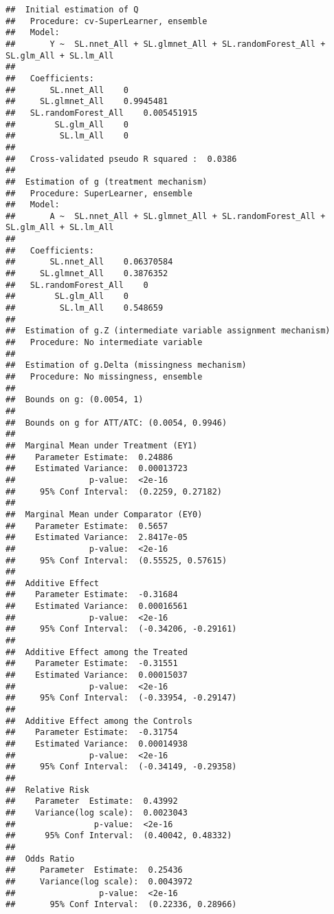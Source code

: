 \documentclass[
]{article}
\newenvironment{Shaded}{\begin{snugshade}}{\end{snugshade}}
\newcommand{\NormalTok}[1]{#1}
\newcommand{\SpecialCharTok}[1]{\textcolor[rgb]{0.81,0.36,0.00}{\textbf{#1}}}
\begin{document}
\begin{verbatim}
##  Initial estimation of Q
##   Procedure: cv-SuperLearner, ensemble
##   Model:
##       Y ~  SL.nnet_All + SL.glmnet_All + SL.randomForest_All + SL.glm_All + SL.lm_All
## 
##   Coefficients: 
##       SL.nnet_All    0 
##     SL.glmnet_All    0.9945481 
##   SL.randomForest_All    0.005451915 
##        SL.glm_All    0 
##         SL.lm_All    0 
## 
##   Cross-validated pseudo R squared :  0.0386 
## 
##  Estimation of g (treatment mechanism)
##   Procedure: SuperLearner, ensemble
##   Model:
##       A ~  SL.nnet_All + SL.glmnet_All + SL.randomForest_All + SL.glm_All + SL.lm_All 
## 
##   Coefficients: 
##       SL.nnet_All    0.06370584 
##     SL.glmnet_All    0.3876352 
##   SL.randomForest_All    0 
##        SL.glm_All    0 
##         SL.lm_All    0.548659 
## 
##  Estimation of g.Z (intermediate variable assignment mechanism)
##   Procedure: No intermediate variable 
## 
##  Estimation of g.Delta (missingness mechanism)
##   Procedure: No missingness, ensemble
## 
##  Bounds on g: (0.0054, 1) 
## 
##  Bounds on g for ATT/ATC: (0.0054, 0.9946) 
## 
##  Marginal Mean under Treatment (EY1)
##    Parameter Estimate:  0.24886
##    Estimated Variance:  0.00013723
##               p-value:  <2e-16
##     95% Conf Interval:  (0.2259, 0.27182)
## 
##  Marginal Mean under Comparator (EY0)
##    Parameter Estimate:  0.5657
##    Estimated Variance:  2.8417e-05
##               p-value:  <2e-16
##     95% Conf Interval:  (0.55525, 0.57615)
## 
##  Additive Effect
##    Parameter Estimate:  -0.31684
##    Estimated Variance:  0.00016561
##               p-value:  <2e-16
##     95% Conf Interval:  (-0.34206, -0.29161)
## 
##  Additive Effect among the Treated
##    Parameter Estimate:  -0.31551
##    Estimated Variance:  0.00015037
##               p-value:  <2e-16
##     95% Conf Interval:  (-0.33954, -0.29147)
## 
##  Additive Effect among the Controls
##    Parameter Estimate:  -0.31754
##    Estimated Variance:  0.00014938
##               p-value:  <2e-16
##     95% Conf Interval:  (-0.34149, -0.29358)
## 
##  Relative Risk
##    Parameter  Estimate:  0.43992
##    Variance(log scale):  0.0023043
##                p-value:  <2e-16
##      95% Conf Interval:  (0.40042, 0.48332)
## 
##  Odds Ratio
##     Parameter  Estimate:  0.25436
##     Variance(log scale):  0.0043972
##                 p-value:  <2e-16
##       95% Conf Interval:  (0.22336, 0.28966)
\end{verbatim}

\begin{Shaded}
\end{Shaded}
\end{document}
